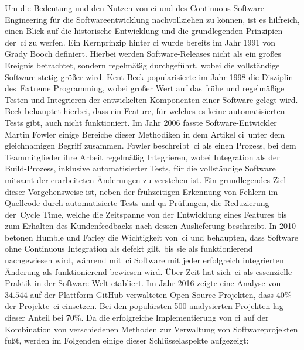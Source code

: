 Um die Bedeutung und den Nutzen von \acrlong{ci} und des Continuous-Software-Engineering für die
Softwareentwicklung nachvollziehen zu können, ist es hilfreich, einen Blick auf die historische Entwicklung und die
grundlegenden Prinzipien der\ \acrshort{ci} zu werfen.
Ein Kernprinzip hinter \acrlong{ci} wurde bereits im Jahr 1991 von Grady Booch definiert.
Hierbei werden Software-Releases nicht als ein großes Ereignis betrachtet, sondern regelmäßig durchgeführt, wobei
die vollständige Software stetig größer wird.
Kent Beck popularisierte im Jahr 1998 die Disziplin des\ \glqq Extreme Programming\grqq, wobei großer Wert auf das frühe
und regelmäßige Testen und Integrieren der entwickelten Komponenten einer Software gelegt wird.
Beck behauptet hierbei, dass ein Feature, für welches es keine automatisierten Tests gibt, auch nicht funktioniert.
Im Jahr 2006 fasste Software-Entwickler Martin Fowler einige Bereiche dieser Methodiken in dem Artikel
\glqq \acrlong{ci}\grqq\ unter dem gleichnamigen Begriff zusammen.
Fowler beschreibt\ \acrshort{ci} als einen Prozess, bei dem Teammitglieder ihre Arbeit regelmäßig Integrieren,
wobei Integration als der Build-Prozess, inklusive automatisierter Tests, für die vollständige Software mitsamt der
erarbeiteten Änderungen zu verstehen ist.
Ein grundlegendes Ziel dieser Vorgehensweise ist, neben der frühzeitigen Erkennung von Fehlern im Quellcode durch
automatisierte Tests und \acrshort{qa}-Prüfungen, die Reduzierung der\ \glqq Cycle Time\grqq, welche die Zeitspanne von
der Entwicklung eines Features bis zum Erhalten des Kundenfeedbacks nach dessen Auslieferung beschreibt.
In 2010 betonen Humble und Farley die Wichtigkeit von\ \acrshort{ci} und behaupten, dass Software ohne Continuous
Integration als defekt gilt, bis sie als funktionierend nachgewiesen wird, während mit\ \acrshort{ci} Software mit
jeder erfolgreich integrierten Änderung als funktionierend bewiesen wird.
Über Zeit hat sich\ \acrshort{ci} als essenzielle Praktik in der Software-Welt etabliert.
Im Jahr 2016 zeigte eine Analyse von $34.544$ auf der Plattform GitHub verwalteten Open-Source-Projekten, dass 40\% der
Projekte\ \acrshort{ci} einsetzen.
Bei den populärsten 500 analysierten Projekten lag dieser Anteil bei 70\%.
Da die erfolgreiche Implementierung von \acrlong{ci} auf der Kombination von verschiedenen Methoden zur
Verwaltung von Softwareprojekten fußt, werden im Folgenden einige dieser Schlüsselaspekte aufgezeigt:

